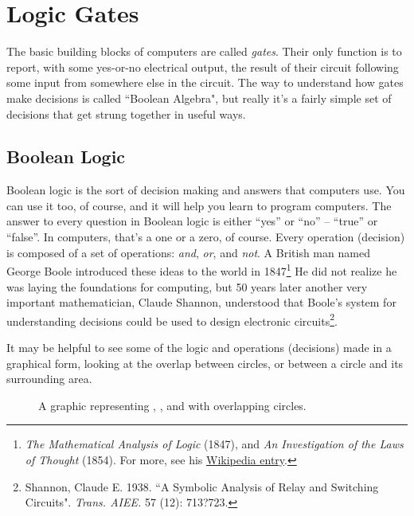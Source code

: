 \section{Logic Gates}

The basic building blocks of computers are called \emph{gates}. Their only function is to report, with some yes-or-no electrical output, the result of their circuit following some input from somewhere else in the circuit. The way to understand how gates make decisions is called ``Boolean Algebra", but really it's a fairly simple set of decisions that get strung together in useful ways.

\subsection*{Boolean Logic}

Boolean logic is the sort of decision making and answers that computers use. You can use it too, of course, and it will help you learn to program computers. The answer to every question in Boolean logic is either ``yes'' or ``no'' -- ``true'' or ``false''. In computers, that's a one or a zero, of course.   Every operation (decision) is composed of a set of operations: \emph{and}, \emph{or}, and \emph{not}. A British man named George Boole introduced these ideas to the world in 1847\footnote{\emph{The Mathematical Analysis of Logic} (1847), and \emph{An Investigation of the Laws of Thought} (1854). For more, see his {\color{webblue}\href{https://en.wikipedia.org/wiki/George_Boole}{Wikipedia entry}}.} He did not realize he was laying the foundations for computing, but 50 years later another very important mathematician, Claude Shannon, understood that Boole's system for understanding decisions could be used to design electronic circuits\footnote{Shannon, Claude E. 1938. ``A Symbolic Analysis of Relay and Switching Circuits". \emph{Trans. AIEE.} 57 (12): 713?723.}. 

It may be helpful to see some of the logic and operations (decisions) made in a graphical form, looking at the overlap between circles, or between a circle and its surrounding area.

\begin{figure}[h!]
\begin{center}

\caption{A graphic representing {}, {}, and {} with overlapping circles.}
\end{center}
\label{fig:vennlogic}
\end{figure}



